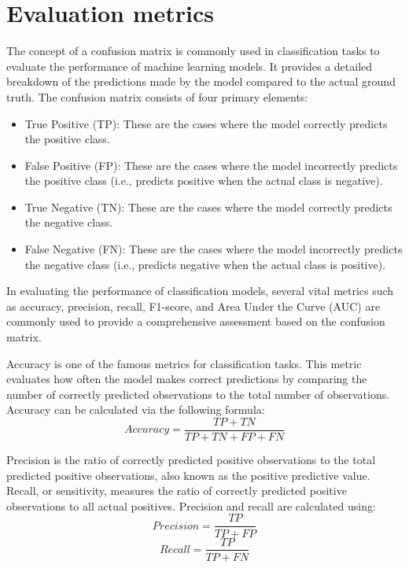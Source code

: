 \section{Evaluation metrics}
The concept of a confusion matrix is commonly used in classification tasks to evaluate the performance of machine learning models. It provides a detailed breakdown of the predictions made by the model compared to the actual ground truth. The confusion matrix consists of four primary elements:
\begin{itemize}
    \item True Positive (TP): These are the cases where the model correctly predicts the positive class.
    \item False Positive (FP): These are the cases where the model incorrectly predicts the positive class (i.e., predicts positive when the actual class is negative).
    \item True Negative (TN): These are the cases where the model correctly predicts the negative class.
    \item False Negative (FN): These are the cases where the model incorrectly predicts the negative class (i.e., predicts negative when the actual class is positive).
\end{itemize}

In evaluating the performance of classification models, several vital metrics such as accuracy, precision, recall, F1-score, and Area Under the Curve (AUC) are commonly used to provide a comprehensive assessment based on the confusion matrix. 

Accuracy is one of the famous metrics for classification tasks. This metric evaluates how often the model makes correct predictions by comparing the number of correctly predicted observations to the total number of observations. Accuracy can be calculated via the following formula:
\begin{equation}
    Accuracy = \frac{TP+TN}{TP+TN+FP+FN}
\end{equation}

Precision is the ratio of correctly predicted positive observations to the total predicted positive observations, also known as the positive predictive value. Recall, or sensitivity, measures the ratio of correctly predicted positive observations to all actual positives. Precision and recall are calculated using:
\begin{equation}
    Precision = \frac{TP}{TP+FP}
\end{equation}
\begin{equation}
    Recall = \frac{TP}{TP+FN}
\end{equation}

